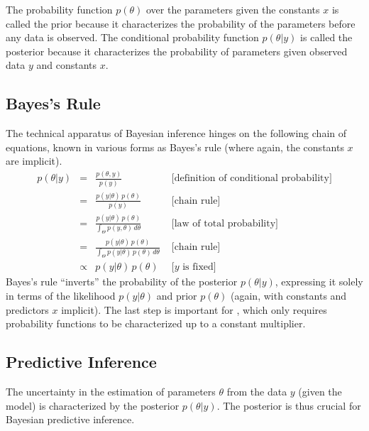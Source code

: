 The probability function $p(\theta)$ over the parameters given the
constants $x$ is called the prior because it characterizes the probability
of the parameters before any data is observed.  The conditional
probability function $p(\theta|y)$ is called the posterior because
it characterizes the probability of parameters given observed data $y$
and constants $x$.  

\subsection{Bayes's Rule}

The technical apparatus of Bayesian inference hinges on the following
chain of equations, known in various forms as Bayes's rule (where
again, the constants $x$ are implicit).
%
\[
\begin{array}{rcll}
p(\theta|y)  & =  & \displaystyle \frac{p(\theta,y)}{p(y)} 
& \mbox{{} \ \ \ \ \ [definition of  conditional probability]}
\\[16pt]
& = & \displaystyle \frac{p(y|\theta) \, p(\theta)}{p(y)}
& \mbox{{} \ \ \ \ \ [chain rule]}
\\[16pt]
& = & \displaystyle \frac{p(y|\theta) \, p(\theta)}
                        {\int_{\Theta} p(y,\theta) \, d\theta}
& \mbox{{} \ \ \ \ \ [law of total probability]}
\\[16pt]
& = & \displaystyle \frac{p(y|\theta) \, p(\theta)}
                        {\int_{\Theta} p(y|\theta) \, p(\theta) \, d\theta}
& \mbox{{} \ \ \ \ \ [chain rule]}
\\[16pt]
& \propto & \displaystyle p(y|\theta) \, p(\theta)
& \mbox{{} \ \ \ \ \ [$y$ is fixed]}
\end{array}
\]
%
Bayes's rule ``inverts'' the probability of the posterior
$p(\theta|y)$, expressing it solely in terms of the likelihood
$p(y|\theta)$ and prior $p(\theta)$ (again, with constants and
predictors $x$ implicit).  The last step is important for \Stan, which
only requires probability functions to be characterized up to a
constant multiplier.

\subsection{Predictive Inference}

The uncertainty in the estimation of parameters $\theta$ from the data
$y$ (given the model) is characterized by the posterior $p(\theta|y)$.
The posterior is thus crucial for Bayesian predictive inference.

